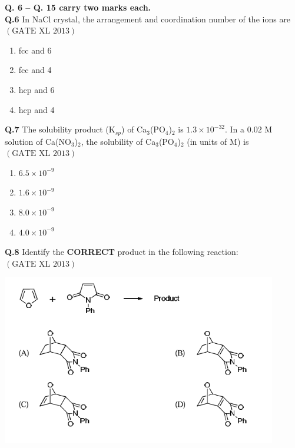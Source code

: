 \documentclass[12pt]{article}
\theoremstyle{remark}
\providecommand{\brak}[1]{\ensuremath{\left(#1\right)}}
\begin{document}
\noindent\textbf{Q. 6 – Q. 15 carry two marks each.}\\

\textbf{Q.6} In NaCl crystal, the arrangement and coordination number of the ions are\hfill $\brak{\text{GATE XL 2013}}$
\begin{enumerate}
    \item fcc and 6
    \item fcc and 4
    \item hcp and 6
    \item hcp and 4
\end{enumerate}

\textbf{Q.7} The solubility product (K$_{sp}$) of Ca$_3$(PO$_4$)$_2$ is $1.3 \times 10^{-32}$. In a $0.02$ M solution of Ca(NO$_3$)$_2$, the solubility of Ca$_3$(PO$_4$)$_2$ (in units of M) is\hfill $\brak{\text{GATE XL 2013}}$
\begin{enumerate}
    \item $6.5 \times 10^{-9}$
    \item $1.6 \times 10^{-9}$
    \item $8.0 \times 10^{-9}$
    \item $4.0 \times 10^{-9}$
\end{enumerate}

\textbf{Q.8} Identify the \textbf{CORRECT} product in the following reaction:\hfill $\brak{\text{GATE XL 2013}}$
\begin{center}
    \includegraphics[width=0.9\textwidth]{figs/xl_2013 que8 ch.png}
\end{center}
\end{document}
